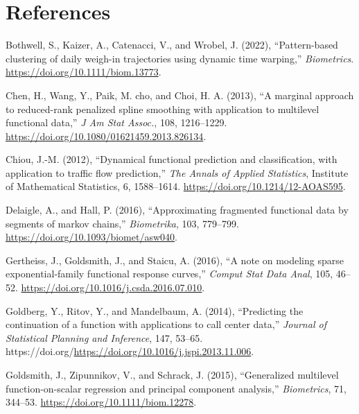 \documentclass[
  11pt,
]{article}
\newlength{\cslhangindent}
\newlength{\cslentryspacingunit} %
\newenvironment{CSLReferences}[2] %
 {%
  \setlength{\parindent}{0pt}
  \ifodd #1
  \let\oldpar\par
  \def\par{\hangindent=\cslhangindent\oldpar}
  \fi
  \setlength{\parskip}{#2\cslentryspacingunit}
 }%
 {}
\begin{document}
\hypertarget{references}{%
\section{References}\label{references}}

\hypertarget{refs}{}
\begin{CSLReferences}{1}{0}
\leavevmode{}%
Bothwell, S., Kaizer, A., Catenacci, V., and Wrobel, J. (2022),
{``Pattern-based clustering of daily weigh-in trajectories using dynamic
time warping,''} \emph{Biometrics}.
\url{https://doi.org/10.1111/biom.13773}.

\leavevmode{}%
Chen, H., Wang, Y., Paik, M. cho, and Choi, H. A. (2013), {``A marginal
approach to reduced-rank penalized spline smoothing with application to
multilevel functional data,''} \emph{J Am Stat Assoc.}, 108, 1216--1229.
\url{https://doi.org/10.1080/01621459.2013.826134}.

\leavevmode{}%
Chiou, J.-M. (2012), {``Dynamical functional prediction and
classification, with application to traffic flow prediction,''}
\emph{The Annals of Applied Statistics}, Institute of Mathematical
Statistics, 6, 1588--1614. \url{https://doi.org/10.1214/12-AOAS595}.

\leavevmode{}%
Delaigle, A., and Hall, P. (2016), {``Approximating fragmented
functional data by segments of markov chains,''} \emph{Biometrika}, 103,
779--799. \url{https://doi.org/10.1093/biomet/asw040}.

\leavevmode{}%
Gertheiss, J., Goldsmith, J., and Staicu, A. (2016), {``A note on
modeling sparse exponential-family functional response curves,''}
\emph{Comput Stat Data Anal}, 105, 46--52.
\url{https://doi.org/10.1016/j.csda.2016.07.010}.

\leavevmode{}%
Goldberg, Y., Ritov, Y., and Mandelbaum, A. (2014), {``Predicting the
continuation of a function with applications to call center data,''}
\emph{Journal of Statistical Planning and Inference}, 147, 53--65.
https://doi.org/\url{https://doi.org/10.1016/j.jspi.2013.11.006}.

\leavevmode{}%
Goldsmith, J., Zipunnikov, V., and Schrack, J. (2015), {``Generalized
multilevel function-on-scalar regression and principal component
analysis,''} \emph{Biometrics}, 71, 344--53.
\url{https://doi.org/10.1111/biom.12278}.


\end{CSLReferences}
\end{document}

